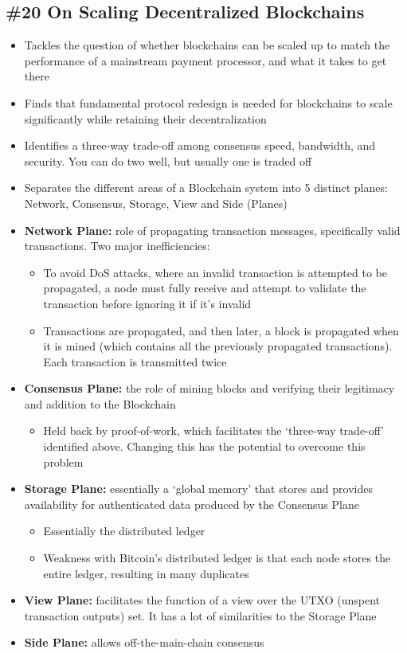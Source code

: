 \subsection*{\#20 On Scaling Decentralized Blockchains}
\begin{itemize}
	\item Tackles the question of whether blockchains can be scaled up to match the performance of a mainstream payment processor, and what it takes to get there
	\item Finds that fundamental protocol redesign is needed for blockchains to scale significantly while retaining their decentralization
	\item Identifies a three-way trade-off among consensus speed, bandwidth, and security. You can do two well, but usually one is traded off
	\item Separates the different areas of a Blockchain system into 5 distinct planes: Network, Consensus, Storage, View and Side (Planes)
	\item \textbf{Network Plane:} role of propagating transaction messages, specifically valid transactions. Two major inefficiencies:
	\begin{itemize}
		\item To avoid DoS attacks, where an invalid transaction is attempted to be propagated, a node must fully receive and attempt to validate the transaction before ignoring it if it's invalid
		\item Transactions are propagated, and then later, a block is propagated when it is mined (which contains all the previously propagated transactions). Each transaction is transmitted twice
	\end{itemize}
	\item \textbf{Consensus Plane:} the role of mining blocks and verifying their legitimacy and addition to the Blockchain
	\begin{itemize}
		\item Held back by proof-of-work, which facilitates the `three-way trade-off' identified above. Changing this has the potential to overcome this problem
	\end{itemize}
	\item \textbf{Storage Plane:} essentially a `global memory' that stores and provides availability for authenticated data produced by the Consensus Plane
	\begin{itemize}
		\item Essentially the distributed ledger
		\item Weakness with Bitcoin's distributed ledger is that each node stores the entire ledger, resulting in many duplicates
	\end{itemize}
	\item\textbf{View Plane:} facilitates the function of a view over the UTXO (unspent transaction outputs) set. It has a lot of similarities to the Storage Plane
	\item\textbf{Side Plane:} allows off-the-main-chain consensus
\end{itemize}